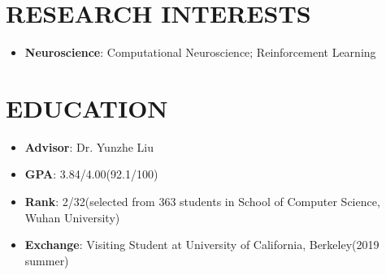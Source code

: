 \documentclass{resume}
\begin{document}


\section{{\bfseries RESEARCH INTERESTS}}
\begin{itemize}[parsep=0.2ex]
  \item \textbf{Neuroscience}: Computational Neuroscience; Reinforcement Learning
\end{itemize}

\section{{\bfseries EDUCATION}}
\begin{itemize}[parsep=0.1ex]
  \item \textbf{Advisor}: Dr. Yunzhe Liu
\end{itemize}
\begin{itemize}[parsep=0.1ex]
  \item \textbf{GPA}: 3.84/4.00(92.1/100)
  \item \textbf{Rank}: 2/32(selected from 363 students in School of Computer Science, Wuhan University)
  \item \textbf{Exchange}: Visiting Student at University of California, Berkeley(2019 summer)
\end{itemize}

\end{document}
